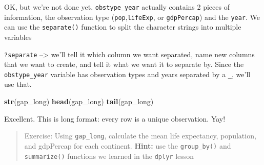 \documentclass[]{book}
\newenvironment{Shaded}{\begin{snugshade}}{\end{snugshade}}
\newcommand{\KeywordTok}[1]{\textcolor[rgb]{0.13,0.29,0.53}{\textbf{{#1}}}}
\newcommand{\DataTypeTok}[1]{\textcolor[rgb]{0.13,0.29,0.53}{{#1}}}
\newcommand{\StringTok}[1]{\textcolor[rgb]{0.31,0.60,0.02}{{#1}}}
\newcommand{\CommentTok}[1]{\textcolor[rgb]{0.56,0.35,0.01}{\textit{{#1}}}}
\newcommand{\NormalTok}[1]{{#1}}
\theoremstyle{definition}
\theoremstyle{definition}
\theoremstyle{definition}
\theoremstyle{remark}
\begin{document}
OK, but we're not done yet. \texttt{obstype\_year} actually contains 2
pieces of information, the observation type
(\texttt{pop},\texttt{lifeExp}, or \texttt{gdpPercap}) and the
\texttt{year}. We can use the \texttt{separate()} function to split the
character strings into multiple variables

\texttt{?separate} --\textgreater{} we'll tell it which column we want
separated, name new columns that we want to create, and tell it what we
want it to separate by. Since the \texttt{obstype\_year} variable has
observation types and years separated by a \texttt{\_}, we'll use that.

\begin{Shaded}
\end{Shaded}

\begin{Shaded}
\begin{Highlighting}[]
\KeywordTok{str}\NormalTok{(gap_long)}
\KeywordTok{head}\NormalTok{(gap_long)}
\KeywordTok{tail}\NormalTok{(gap_long)}
\end{Highlighting}
\end{Shaded}

Excellent. This is long format: every row is a unique observation. Yay!

\begin{quote}
Exercise: Using \texttt{gap\_long}, calculate the mean life expectancy,
population, and gdpPercap for each continent. \textbf{Hint:} use the
\texttt{group\_by()} and \texttt{summarize()} functions we learned in
the \texttt{dplyr} lesson
\end{quote}

\begin{Shaded}
\end{Shaded}
\end{document}
